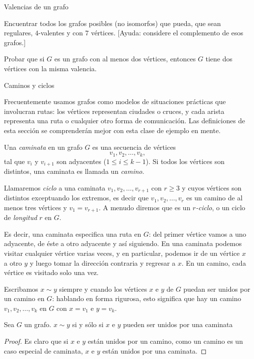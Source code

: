 \begin{section}{Valencias de un grafo}
\begin{enumex}
\item Encuentrar todos los grafos posibles (no isomorfos) que pueda, que sean regulares, $4$-valentes y con $7$ vértices. [Ayuda: considere el complemento de esos grafos.]

\item Probar que si $G$ es un grafo con al menos dos vértices, entonces $G$ tiene dos vértices con la misma valencia.
\end{enumex}

\end{section}


\begin{section}{Caminos y ciclos}\label{seccion-caminos-y-ciclos}

Frecuentemente usamos grafos como modelos de situaciones prácticas que involucran rutas: los vértices representan ciudades o cruces, y cada arista representa una ruta o cualquier otro forma de comunicación. Las definiciones de esta sección se comprenderán mejor con esta clase de ejemplo en mente.

\begin{definicion}  Una \textit{caminata} en un grafo $G$ es   una secuencia de vértices
$$
v_1,v_2,\ldots,v_k,
$$
tal que $v_i$ y $v_{i+1}$ son adyacentes ($1 \le i \le k-1$). Si todos los vértices son distintos, una caminata es llamada un \textit{camino}.  

Llamaremos \textit{ciclo} a una caminata  $v_1,v_2,\ldots,v_{r+1}$  con $r \ge 3$ y cuyos vértices son distintos exceptuando los extremos, es decir que $v_1,v_2,\ldots,v_{r}$ es un camino de al menos tres vértices y $v_1=v_{r+1}$.  A menudo diremos que es un \textit{$r$-ciclo}, o un ciclo de \textit{longitud} $r$ en $G$.  
\end{definicion}

Es decir, una caminata especifica una ruta en $G$: del primer vértice vamos a uno adyacente, de éste a otro adyacente y así siguiendo. En una caminata podemos visitar cualquier vértice varias veces, y en particular, podemos ir de un vértice $x$ a otro $y$ y luego tomar la dirección contraria y regresar a $x$. En un camino, cada vértice es visitado solo una vez.

Escribamos $x \sim y$ siempre y cuando los vértices $x$ e $y$ de $G$ puedan ser unidos por un camino en $G$: hablando en forma rigurosa, esto significa que hay un camino $v_1,v_2,\ldots,v_k$ en $G$ con $x=v_1$ e $y=v_k$. 

\begin{lema} Sea $G$ un grafo. $x \sim y$ si  y sólo si $x$ e $y$ pueden ser unidos por una caminata 
\end{lema}
\begin{proof}Es claro que si $x$ e $y$ están unidos por un camino, como  un camino es un caso especial de caminata, $x$ e $y$ están unidos por una caminata.


\end{proof}
\end{section}

